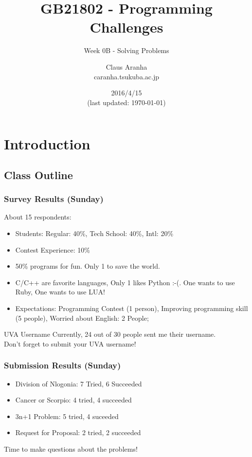 \documentclass{beamer}
\title[GB21802]{GB21802 - Programming Challenges}
\subtitle[]{Week 0B - Solving Problems}
\author[Claus Aranha]{Claus Aranha\\{\footnotesize caranha\@@cs.tsukuba.ac.jp}}
\institute{Department of Computer Science}
\date{2016/4/15\\{\smaller(last updated: \today)}}
\begin{document}

\section{Introduction}
\subsection{Class Outline}

\begin{frame}
\maketitle
\end{frame}

\begin{frame}
  \frametitle{Survey Results (Sunday)}

  About 15 respondents:
  \begin{itemize}
  \item Students: Regular: 40\%, Tech School: 40\%, Intl: 20\%
  \item Contest Experience: 10\%
  \item 50\% programs for fun. Only 1 to save the world.
  \item C/C++ are favorite languages, Only 1 likes Python :-(. One
    wants to use Ruby, One wants to use LUA!
  \item Expectations: Programming Contest (1 person), Improving
    programming skill (5 people), Worried about English: 2 People;
  \end{itemize}

  \vfill
  
  \begin{alertblock}{UVA Username}
    Currently, \alert{24 out of 30} people sent me their username.\\
    Don't forget to submit your UVA username!
  \end{alertblock}
\end{frame}

\begin{frame}
  \frametitle{Submission Results (Sunday)}

  \begin{itemize}
  \item Division of Nlogonia: 7 Tried, 6 Succeeded
  \item Cancer or Scorpio: 4 tried, 4 succeeded
  \item 3n+1 Problem: 5 tried, 4 suceeded
  \item Request for Proposal: 2 tried, 2 succeeded
  \end{itemize}

  \vfill

  \begin{center}
    Time to make questions about the problems!
  \end{center}
\end{frame}
\end{document}
